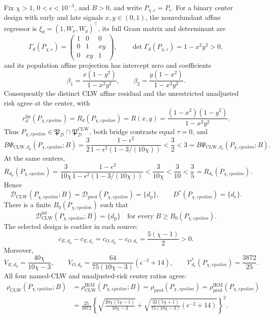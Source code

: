 Fix \(\chi>1\), \(0<\epsilon<10^{-3}\), and \(B>0\), and write \(P_{\chi,\epsilon}=P_\epsilon\). For a binary center design with early and late signals \(x,y\in(0,1)\), the nonredundant affine regressor is \(\xi_d=(1,W_x,W_y)^\top\), its full Gram matrix and determinant are
\[
 \Gamma_d(P_{\chi,\epsilon})=
 \begin{pmatrix}1&0&0\\0&1&xy\\0&xy&1\end{pmatrix},
 \qquad
 \det\Gamma_d(P_{\chi,\epsilon})=1-x^2y^2>0,              \tag{1}
\]
and its population affine projection has intercept zero and coefficients
\[
 \beta_1=\frac{x(1-y^2)}{1-x^2y^2},
 \qquad
 \beta_2=\frac{y(1-x^2)}{1-x^2y^2}.                       \tag{2}
\]
Consequently the distinct CLW affine residual and the unrestricted unadjusted risk agree at the center, with
\[
 r_d^{\mathrm{lin}}(P_{\chi,epsilon})
 =R_d(P_{\chi,epsilon})
 =R(x,y)=\frac{(1-x^2)(1-y^2)}{1-x^2y^2}.                 \tag{3}
\]
Thus \(P_{\chi,epsilon}\in\mathfrak P_{\mathcal D}\cap\mathfrak P_{\mathcal D}^{\mathrm{CLW}}\), both bridge contrasts equal \(\tau=0\), and
\[
 B\Psi_{\mathrm{CLW},d_{\mathrm p}}(P_{\chi,epsilon};B)
 =\frac32\frac{1-\epsilon^2}{1-\epsilon^2(1-3/(10\chi))}
 <\frac32<3
 =B\Psi_{\mathrm{CLW},d_{\mathrm e}}(P_{\chi,epsilon};B). \tag{4}
\]
At the same centers,
\[
 R_{d_{\mathrm p}}(P_{\chi,epsilon})
 =\frac{3}{10\chi}\frac{1-\epsilon^2}
 {1-\epsilon^2(1-3/(10\chi))}
 <\frac{3}{10\chi}<\frac3{10}<\frac35
 =R_{d_{\mathrm e}}(P_{\chi,epsilon}).                  \tag{5}
\]
Hence
\[
 \mathcal D_{\mathrm{CLW}}(P_{\chi,epsilon};B)
 =\mathcal D_{\mathrm{pred}}(P_{\chi,epsilon})
 =\{d_{\mathrm p}\},
 \qquad
 D^*(P_{\chi,epsilon})=\{d_{\mathrm e}\}.              \tag{6}
\]
There is a finite \(B_0(P_{\chi,epsilon})\) such that
\[
 \mathcal D_{\mathrm{CLW}}^{\mathrm{int}}(P_{\chi,epsilon};B)
 =\{d_{\mathrm p}\}
 \quad\text{for every }B\ge B_0(P_{\chi,epsilon}).      \tag{7}
\]
The selected design is costlier in each source:
\[
 c_{E,d_{\mathrm p}}-c_{E,d_{\mathrm e}}
 =c_{O,d_{\mathrm p}}-c_{O,d_{\mathrm e}}
 =\frac{5(\chi-1)}2>0.
\]
Moreover,
\[
 V_{E,d_{\mathrm p}}=\frac{40\chi}{10\chi-3},
 \qquad
 V_{O,d_{\mathrm p}}
 =\frac{64}{75(10\chi-3)}(\epsilon^{-2}+14),
 \qquad
 \mathcal V_{d_{\mathrm e}}^*(P_{\chi,epsilon})=\frac{3872}{25}.
\]
All four named-CLW and unadjusted-risk center ratios agree:
\[
\begin{aligned}
 \rho_{\mathrm{CLW}}(P_{\chi,epsilon};B)
 &=\rho_{\mathrm{CLW}}^{\mathrm{IKM}}(P_{\chi,epsilon};B)
 =\rho_{\mathrm{pred}}(P_{\chi,epsilon})
 =\rho_{\mathrm{pred}}^{\mathrm{IKM}}(P_{\chi,epsilon})\\
 &=\frac{25}{3872}
 \left\{
 \sqrt{\frac{20\chi(5\chi-1)}{10\chi-3}}
 +\sqrt{\frac{32(5\chi+1)}{75(10\chi-3)}
 (\epsilon^{-2}+14)}
 \right\}^{2}.                                            \tag{8}
\end{aligned}
\]
